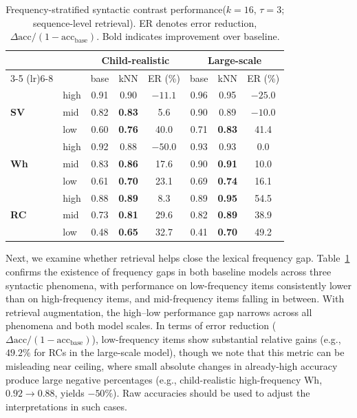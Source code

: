\begin{table}
\centering
\caption{Frequency-stratified syntactic contrast performance($k=16$, $\tau=3$; sequence-level retrieval). ER denotes error reduction,
$\Delta\mathrm{acc}/(1-\mathrm{acc}_{\mathrm{base}})$. Bold indicates improvement over baseline.}
\vspace{6pt}
\label{tab:frequency_effects}
\small
\setlength{\tabcolsep}{4pt}
\renewcommand{\arraystretch}{0.96}
\begin{tabular}{@{}llcccccc@{}}
\toprule
& & \multicolumn{3}{c}{\textbf{Child-realistic}} &
    \multicolumn{3}{c}{\textbf{Large-scale}} \\
\cmidrule(lr){3-5} \cmidrule(lr){6-8}
& & base & kNN & ER (\%) & base & kNN & ER (\%) \\
\midrule
\multirow{3}{*}{\textbf{SV}}
& high & 0.91 & 0.90 & $-11.1$ & 0.96 & 0.95 & $-25.0$ \\
& mid  & 0.82 & \textbf{0.83} & 5.6
       & 0.90 & 0.89 & $-10.0$ \\
& low  & 0.60 & \textbf{0.76} & 40.0
       & 0.71 & \textbf{0.83} & 41.4 \\
\midrule
\multirow{3}{*}{\textbf{Wh}}
& high & 0.92 & 0.88 & $-50.0$ & 0.93 & 0.93 & 0.0 \\
& mid  & 0.83 & \textbf{0.86} & 17.6
       & 0.90 & \textbf{0.91} & 10.0 \\
& low  & 0.61 & \textbf{0.70} & 23.1
       & 0.69 & \textbf{0.74} & 16.1 \\
\midrule
\multirow{3}{*}{\textbf{RC}}
& high & 0.88 & \textbf{0.89} & 8.3
       & 0.89 & \textbf{0.95} & 54.5 \\
& mid  & 0.73 & \textbf{0.81} & 29.6
       & 0.82 & \textbf{0.89} & 38.9 \\
& low  & 0.48 & \textbf{0.65} & 32.7
       & 0.41 & \textbf{0.70} & 49.2 \\
\bottomrule
\end{tabular}
\end{table}

Next, we examine whether retrieval helps close the lexical frequency gap. Table~\ref{tab:frequency_effects} confirms the existence of frequency gaps in both baseline models across three syntactic phenomena, with performance on low-frequency items consistently lower than on high-frequency items, and mid-frequency items falling in between. With retrieval augmentation, the high--low performance gap narrows across all phenomena and both model scales. In terms of error reduction ($\Delta\text{acc}/(1-\text{acc}_{\text{base}})$), low-frequency items show substantial relative gains (e.g., $49.2\%$ for RCs in the large-scale model), though we note that this metric can be misleading near ceiling, where small absolute changes in already-high accuracy produce large negative percentages (e.g., child-realistic high-frequency Wh, $0.92 \rightarrow 0.88$, yields $-50\%$). Raw accuracies should be used to adjust the interpretations in such cases. 

